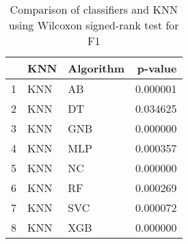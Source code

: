 \begin{table}
\footnotesize
\caption{Comparison of classifiers and KNN using Wilcoxon signed-rank test for F1}
\label{tab:KNN wilcoxon F1 comparison}
\begin{tabular}{lllr}
\hline
 & KNN & Algorithm & p-value \\
\hline
1 & KNN & AB & 0.000001 \\
2 & KNN & DT & 0.034625 \\
3 & KNN & GNB & 0.000000 \\
4 & KNN & MLP & 0.000357 \\
5 & KNN & NC & 0.000000 \\
6 & KNN & RF & 0.000269 \\
7 & KNN & SVC & 0.000072 \\
8 & KNN & XGB & 0.000000 \\
\hline
\end{tabular}
\end{table}
